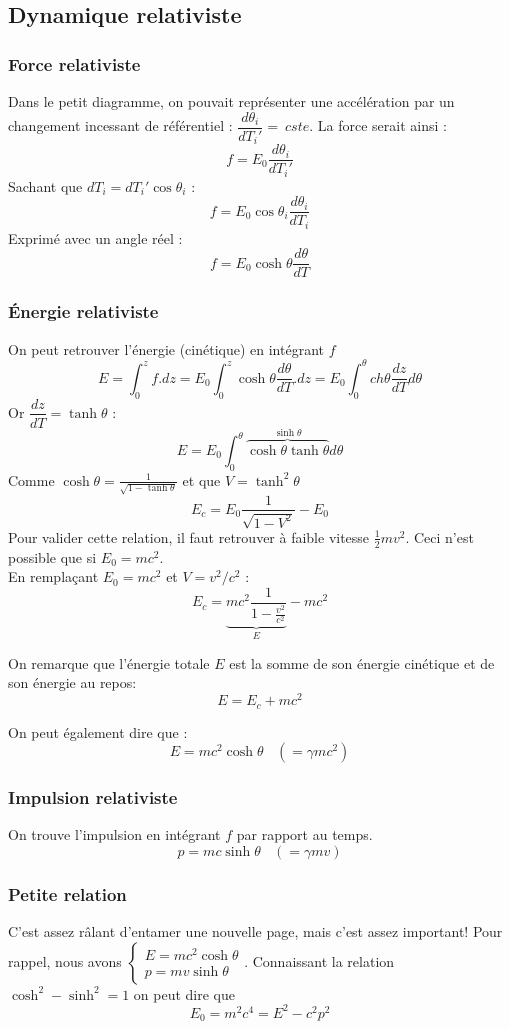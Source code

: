 \documentclass	[11pt, a4paper, openany]{book}
\begin{document}
\subsection*{Dynamique relativiste}
\subsubsection*{Force relativiste}
Dans le petit diagramme, on pouvait représenter une accélération par un changement incessant de référentiel : $\dfrac{d\theta_i}{dT_i'} =\ cste$. La force serait ainsi :
$$f = E_0\dfrac{d\theta_i}{dT_i'}$$
Sachant que $dT_i = dT_i'\cos\theta_i$ :
$$f = E_0\cos\theta_i \frac{d\theta_i}{dT_i}$$
Exprimé avec un angle réel :
$$ f = E_0 \cosh\theta \frac{d\theta}{dT}$$

\subsubsection{Énergie relativiste}
On peut retrouver l'énergie (cinétique) en intégrant $f$
$$E = \int_0^z f.dz = E_0\int_0^z \cosh\theta\frac{d\theta}{dT}.dz = E_0\int_0^\theta ch\theta\frac{dz}{dT}d\theta$$
Or $\dfrac{dz}{dT} = \tanh\theta$ :
$$E = E_0 \int_0^\theta \overbrace{\cosh\theta\tanh\theta}^{\sinh\theta}d\theta$$
Comme $\cosh\theta = \frac{1}{\sqrt{1 - \tanh\theta}}$ et que $V = \tanh^2\theta$
$$E_c = E_0\frac{1}{\sqrt{1-V^2}} - E_0$$
Pour valider cette relation, il faut retrouver à faible vitesse $\frac{1}{2}mv^2$. Ceci n'est possible que si $E_0 = mc^2$.\\
En remplaçant $E_0 = mc^2$ et $V = v^2/c^2$ :
$$E_c = \underbrace{mc^2 \dfrac{1}{1 - \frac{v^2}{c^2}}}_E - mc^2$$

On remarque que l'énergie totale $E$ est la somme de son énergie cinétique et de son énergie au repos:
$$E = E_c + mc^2$$

On peut également dire que :
$$E = mc^2\cosh\theta\ \ \ \ (= \gamma mc^2)$$

\subsubsection*{Impulsion relativiste}
On trouve l'impulsion en intégrant $f$ par rapport au temps.
$$p = mc\sinh\theta\ \ \ \ (= \gamma mv)$$

\subsubsection*{Petite relation}
C'est assez râlant d'entamer une nouvelle page, mais c'est assez important! Pour rappel, nous avons $\left\{\begin{array}{l}
E = mc^2\cosh\theta\\
p = mv\sinh\theta
\end{array}\right.$. Connaissant la relation $\cosh^2 - \sinh^2 = 1$ on peut dire que 
$$E_0 = m^2c^4 = E^2 - c^2p^2$$
\end{document}
